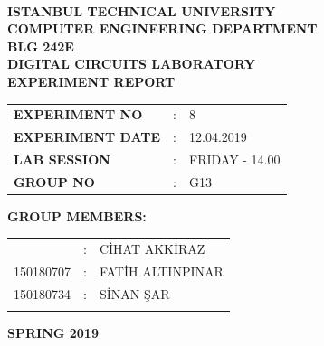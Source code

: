 \documentclass[pdftex,12pt,a4paper]{article}
\begin{document}
\begin{titlepage}
\begin{center}
\textbf{}\\
\textbf{\Large{ISTANBUL TECHNICAL UNIVERSITY}}\\
\vspace{0.5cm}
\textbf{\Large{COMPUTER ENGINEERING DEPARTMENT}}\\
\vspace{2cm}
\textbf{\Large{BLG 242E\\ DIGITAL CIRCUITS LABORATORY\\ EXPERIMENT REPORT}}\\
\vspace{2.8cm}
\begin{table}[ht]
\centering
\Large{
\begin{tabular}{lcl}
\textbf{EXPERIMENT NO}  & : & 8 \\
\textbf{EXPERIMENT DATE}  & : & 12.04.2019 \\
\textbf{LAB SESSION}  & : & FRIDAY - 14.00 \\
\textbf{GROUP NO}  & : & G13 \\
\end{tabular}}
\end{table}
\vspace{1cm}
\textbf{\Large{GROUP MEMBERS:}}\\
\begin{table}[ht]
\centering
\Large{
\begin{tabular}{rcl}
{
150180704  & : & C\.{I}HAT AKK\.{I}RAZ \\
150180707  & : & FAT\.{I}H ALTINPINAR \\
150180734  & : & S\.{I}NAN \c{S}AR \\
}
\end{tabular}}
\end{table}
\vspace{2.8cm}
\textbf{\Large{SPRING 2019}}

\end{center}

\end{titlepage}

 
 

\thispagestyle{empty}
\setcounter{tocdepth}{4}
\tableofcontents
\clearpage
\end{document}
